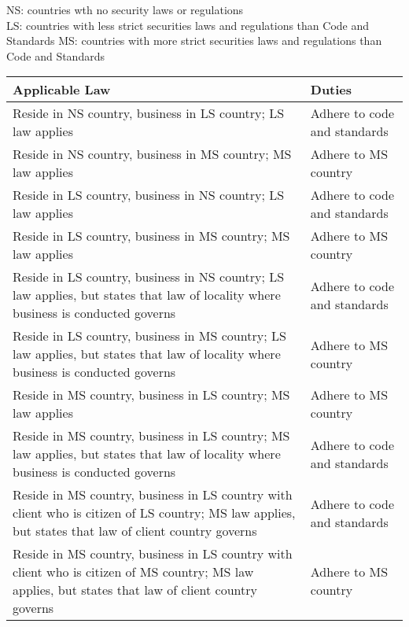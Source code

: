 \begin{flushleft}
NS: countries wth no security laws or regulations\\
LS: countries with less strict securities laws and regulations than Code and Standards
MS: countries with more strict securities laws and regulations than Code and Standards
\begin{tabularx}{\textwidth}{X|p{14em}}
\hline
\rowcolor{gray!30}
Applicable Law & Duties\\
\hline
Reside in NS country, business in LS country; LS law applies & Adhere to code and standards\\
\hline
Reside in NS country, business in MS country; MS law applies & Adhere to MS country\\
\hline
Reside in LS country, business in NS country; LS law applies & Adhere to code and standards\\
\hline
Reside in LS country, business in MS country; MS law applies & Adhere to MS country\\
\hline
Reside in LS country, business in NS country; LS law applies, but states that law of locality where business is conducted governs & Adhere to code and standards\\
\hline
Reside in LS country, business in MS country; LS law applies, but states that law of locality where business is conducted governs & Adhere to MS country\\
\hline
Reside in MS country, business in LS country; MS law applies & Adhere to MS country\\
\hline
Reside in MS country, business in LS country; MS law applies, but states that law of locality where business is conducted governs & Adhere to code and standards\\
\hline
Reside in MS country, business in LS country with client who is citizen of LS country; MS law applies, but states that law of client country governs & Adhere to code and standards\\
\hline
Reside in MS country, business in LS country with client who is citizen of MS country; MS law applies, but states that law of client country governs & Adhere to MS country\\
\hline
\end{tabularx}
\end{flushleft}

